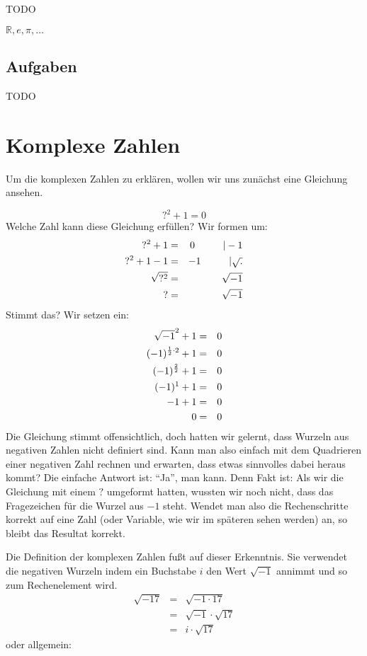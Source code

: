 TODO

$\mathbb{R}, e, \pi, \dots $

\section{Aufgaben}
TODO

\chapter{Komplexe Zahlen}

Um die komplexen Zahlen zu erklären, wollen wir uns zunächst eine Gleichung ansehen. 

\[ ?^2 +1 = 0 \]
Welche Zahl kann diese Gleichung erfüllen? Wir formen um:
\begin{eqnarray*}
?^2 +1 &=& 0 \hskip 1cm | -1 \\
?^2 +1 -1 &=& -1 \hskip 1cm | \sqrt{.} \\
\sqrt{?^2} &=& \sqrt{-1} \\
? &=& \sqrt{-1}
\end{eqnarray*}
Stimmt das? Wir setzen ein:
\begin{eqnarray*}
\sqrt{-1}^2 +1 &=& 0 \\
(-1)^{{1 \over 2}\cdot 2} +1 &=& 0 \\
(-1)^{{2 \over 2}} +1 &=& 0 \\
(-1)^{1} +1 &=& 0 \\
-1+1 &=& 0 \\
0 &=& 0
\end{eqnarray*}
Die Gleichung stimmt offensichtlich, doch hatten wir gelernt, dass Wurzeln aus negativen Zahlen nicht definiert sind. Kann man also einfach mit dem Quadrieren einer negativen Zahl rechnen und erwarten, dass etwas sinnvolles dabei heraus kommt? Die einfache Antwort ist: "`Ja"', man kann. Denn Fakt ist: Als wir die Gleichung mit einem $?$ umgeformt hatten, wussten wir noch nicht, dass das Fragezeichen für die Wurzel aus $-1$ steht. Wendet man also die Rechenschritte korrekt auf eine Zahl (oder Variable, wie wir im späteren sehen werden) an, so bleibt das Resultat korrekt. 

Die Definition der komplexen Zahlen fußt auf dieser Erkenntnis. Sie verwendet die negativen Wurzeln indem ein Buchstabe $i$ den Wert $\sqrt{-1}$ annimmt und so zum Rechenelement wird.
\begin{eqnarray*}
\sqrt{-17} &=& \sqrt{-1\cdot 17}\\
&=& \sqrt{-1}\cdot \sqrt{17}\\
&=& i \cdot \sqrt{17}
\end{eqnarray*}
oder allgemein:

